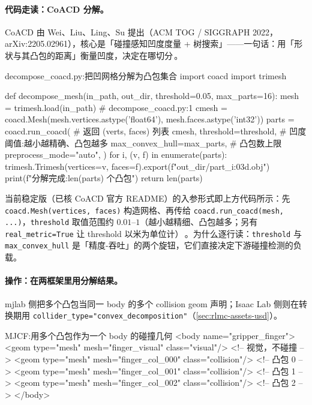 \paragraph{代码走读：CoACD 分解。}CoACD 由 Wei、Liu、Ling、Su 提出（ACM TOG / SIGGRAPH 2022，arXiv:2205.02961），核心是「碰撞感知凹度度量 + 树搜索」——一句话：用「形状与其凸包的距离」衡量凹度，决定在哪切分\,\cite{wei2022coacd}。

\begin{codebox}[Python]{decompose\_coacd.py:把凹网格分解为凸包集合}
import coacd
import trimesh

def decompose_mesh(in_path, out_dir, threshold=0.05, max_parts=16):
    mesh = trimesh.load(in_path)                         # decompose_coacd.py:1
    cmesh = coacd.Mesh(mesh.vertices.astype('float64'),
                       mesh.faces.astype('int32'))
    parts = coacd.run_coacd(                              # 返回 (verts, faces) 列表
        cmesh,
        threshold=threshold,        # 凹度阈值:越小越精确、凸包越多
        max_convex_hull=max_parts,  # 凸包数上限
        preprocess_mode="auto",
    )
    for i, (v, f) in enumerate(parts):
        trimesh.Trimesh(vertices=v, faces=f).export(f"{out_dir}/part_{i:03d}.obj")
    print(f"分解完成:{len(parts)} 个凸包")
    return len(parts)
\end{codebox}

当前稳定版（已核 CoACD 官方 README）的入参形式即上方代码所示：先 \texttt{coacd.\allowbreak Mesh(vertices, faces)} 构造网格、再传给 \texttt{coacd.\allowbreak run\_coacd(mesh, ...)}，\texttt{threshold} 取值范围约 $0.01$--$1$（越小越精细、凸包越多；另有 \texttt{real\_metric=True} 让 threshold 以米为单位计）\,\cite{wei2022coacd}。为什么逐行读：\texttt{threshold} 与 \texttt{max\_convex\_hull} 是「精度-吞吐」的两个旋钮，它们直接决定下游碰撞检测的负载。

\paragraph{操作：在两框架里用分解结果。}mjlab 侧把多个凸包当同一 body 的多个 collision geom 声明；Isaac Lab 侧则在转换期用 \texttt{collider\_type="convex\_decomposition"}（\cref{sec:rlmc-assets-usd}）。

\begin{codebox}[text]{MJCF:用多个凸包作为一个 body 的碰撞几何}
<body name="gripper_finger">
  <geom type="mesh" mesh="finger_visual" class="visual"/>      <!-- 视觉，不碰撞 -->
  <geom type="mesh" mesh="finger_col_000" class="collision"/>  <!-- 凸包 0 -->
  <geom type="mesh" mesh="finger_col_001" class="collision"/>  <!-- 凸包 1 -->
  <geom type="mesh" mesh="finger_col_002" class="collision"/>  <!-- 凸包 2 -->
</body>
\end{codebox}

